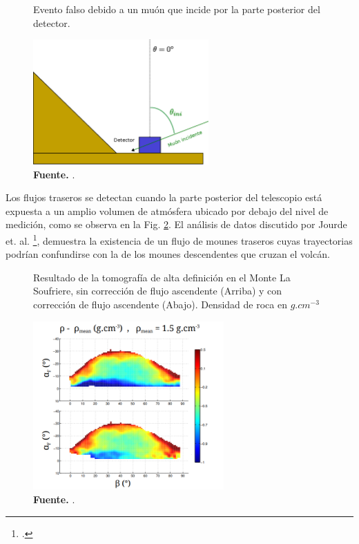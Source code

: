 \begin{figure}[H]
    \begin{center}
        \caption[Evento falso debido a un muón que incide por la parte posterior del detector]{Evento falso debido a un muón que incide por la parte posterior del detector.}
        \includegraphics[width=0.6\textwidth]{Figures/imagenes/Albedo.eps}
        \caption*{\textbf{Fuente.} \cite{jesusP}. }
        \label{Albedo}
    \end{center}
\end{figure}

 
Los flujos traseros se detectan cuando la parte posterior del telescopio está expuesta a un amplio volumen de atmósfera ubicado por debajo del nivel de medición, como se observa en la Fig. \ref{topograf}. El análisis de datos discutido por Jourde et. al. \footcite{jourde2013experimental}, demuestra la existencia de un flujo de mounes traseros cuyas trayectorias podrían confundirse con la de los mounes descendentes que cruzan el volcán.


\begin{figure}[H]
    \begin{center}
        \caption{Resultado de la tomografía de alta definición en el Monte La Soufriere, sin corrección de flujo ascendente (Arriba) y con corrección de flujo ascendente (Abajo). Densidad de roca en $g.cm^{-3}$ }
        \includegraphics[width=0.65\textwidth]{Figures/imagenes/tomografia.png}
        \caption*{\textbf{Fuente.} \cite{jourde2013effects}. }
        \label{topograf}
    \end{center}
\end{figure}


